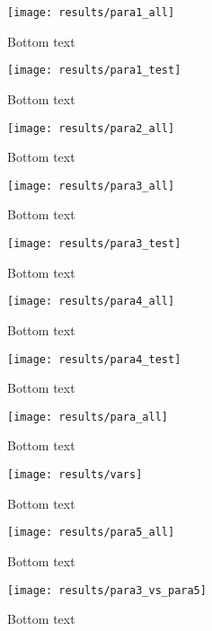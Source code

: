 \begin{figure}
    \centering
    \texttt{[image: results/para1\_all]}
    \caption{Bottom text}
    \label{fig:para1_all}
\end{figure}

\begin{figure}
    \centering
    \texttt{[image: results/para1\_test]}
    \caption{Bottom text}
    \label{fig:para1_test}
\end{figure}

\begin{figure}
    \centering
    \texttt{[image: results/para2\_all]}
    \caption{Bottom text}
    \label{fig:para2_all}
\end{figure}

\begin{figure}
    \centering
    \texttt{[image: results/para3\_all]}
    \caption{Bottom text}
    \label{fig:para3_all}
\end{figure}

\begin{figure}
    \centering
    \texttt{[image: results/para3\_test]}
    \caption{Bottom text}
    \label{fig:para3_test}
\end{figure}

\begin{figure}
    \centering
    \texttt{[image: results/para4\_all]}
    \caption{Bottom text}
    \label{fig:para4_all}
\end{figure}

\begin{figure}
    \centering
    \texttt{[image: results/para4\_test]}
    \caption{Bottom text}
    \label{fig:para4_test}
\end{figure}

\begin{figure}
    \centering
    \texttt{[image: results/para\_all]}
    \caption{Bottom text}
    \label{fig:para_all}
\end{figure}

\begin{figure}
    \centering
    \texttt{[image: results/vars]}
    \caption{Bottom text}
    \label{fig:para_vars}
\end{figure}

\begin{figure}
    \centering
    \texttt{[image: results/para5\_all]}
    \caption{Bottom text}
    \label{fig:para5_all}
\end{figure}

\begin{figure}
    \centering
    \texttt{[image: results/para3\_vs\_para5]}
    \caption{Bottom text}
    \label{fig:para3_vs_para5}
\end{figure}